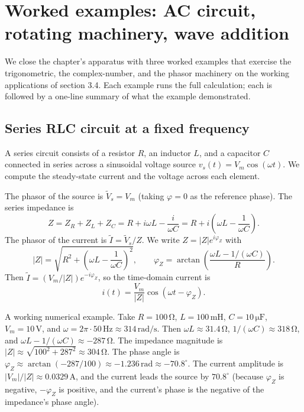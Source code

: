 \section{Worked examples: AC circuit, rotating machinery, wave addition}

We close the chapter's apparatus with three worked examples that
exercise the trigonometric, the complex-number, and the phasor
machinery on the working applications of section 3.4. Each example
runs the full calculation; each is followed by a one-line summary
of what the example demonstrated.

\subsection{Series RLC circuit at a fixed frequency}

A series circuit consists of a resistor $R$, an inductor $L$,
and a capacitor $C$ connected in series across a sinusoidal
voltage source $v_{s}(t) = V_{m}\cos(\omega t)$. We compute the
steady-state current and the voltage across each element.

The phasor of the source is $\tilde{V}_{s} = V_{m}$ (taking
$\varphi = 0$ as the reference phase). The series impedance is
\[
Z = Z_{R} + Z_{L} + Z_{C} = R + i\omega L - \frac{i}{\omega C} = R + i\left(\omega L - \frac{1}{\omega C}\right).
\]
The phasor of the current is $\tilde{I} = \tilde{V}_{s}/Z$. We
write $Z = |Z| e^{i\varphi_{Z}}$ with
\[
|Z| = \sqrt{R^{2} + \left(\omega L - \frac{1}{\omega C}\right)^{2}}, \qquad \varphi_{Z} = \arctan\!\left(\frac{\omega L - 1/(\omega C)}{R}\right).
\]
Then $\tilde{I} = (V_{m}/|Z|) e^{-i\varphi_{Z}}$, so the
time-domain current is
\[
i(t) = \frac{V_{m}}{|Z|}\cos(\omega t - \varphi_{Z}).
\]

A working numerical example. Take $R = 100 \,\si{\ohm}$,
$L = 100 \,\si{\milli\henry}$, $C = 10 \,\si{\micro\farad}$,
$V_{m} = 10 \,\si{\volt}$, and $\omega = 2\pi \cdot 50 \,\si{\hertz}
\approx 314 \,\si{\radian\per\second}$. Then $\omega L \approx
31.4 \,\si{\ohm}$, $1/(\omega C) \approx 318 \,\si{\ohm}$, and
$\omega L - 1/(\omega C) \approx -287 \,\si{\ohm}$. The
impedance magnitude is $|Z| \approx \sqrt{100^{2} + 287^{2}}
\approx 304 \,\si{\ohm}$. The phase angle is $\varphi_{Z}
\approx \arctan(-287/100) \approx -1.236 \,\text{rad} \approx
-70.8^{\circ}$. The current amplitude is $|V_{m}|/|Z| \approx
0.0329 \,\si{\ampere}$, and the current leads the source by
$70.8^{\circ}$ (because $\varphi_{Z}$ is negative, $-\varphi_{Z}$
is positive, and the current's phase is the negative of the
impedance's phase angle).

